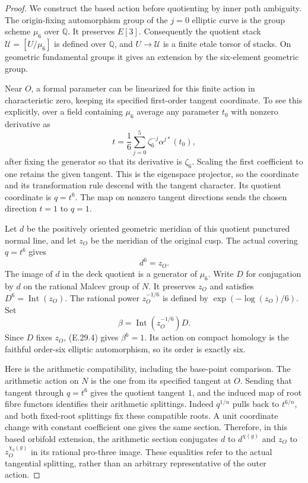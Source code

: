 \begin{proof}
We construct the based action before quotienting by
inner path ambiguity. The origin-fixing automorphism
group of the $j=0$ elliptic curve is the group scheme
$\mu_6$ over $\mathbb Q$. It preserves $E[3]$.
Consequently the quotient stack
$\mathcal U=[U/\mu_6]$ is defined over $\mathbb Q$,
and $U\to\mathcal U$ is a finite etale torsor of
stacks. On geometric fundamental groups it gives
an extension by the six-element geometric group.

Near $O$, a formal parameter can be linearized for
this finite action in characteristic zero, keeping
its specified first-order tangent coordinate. To
see this explicitly, over a field containing
$\mu_6$ average any parameter $t_0$ with nonzero
derivative as
\[
       t=\frac16\sum_{j=0}^5
                 \zeta_6^{-j}\alpha^{j*}(t_0),
\]
after fixing the generator so that its derivative
is $\zeta_6$. Scaling the first coefficient to one
retains the given tangent. This is the eigenspace
projector, so the coordinate and its transformation
rule descend with the tangent character. Its
quotient coordinate is $q=t^6$. The map on nonzero
tangent directions sends the chosen direction
$t=1$ to $q=1$.

Let $d$ be the positively oriented geometric
meridian of this quotient punctured normal line,
and let $z_O$ be the meridian of the original cusp.
The actual covering $q=t^6$ gives
\[
                          d^6=z_O.
 \tag{E.29.4}
\]
The image of $d$ in the deck quotient is a generator
of $\mu_6$. Write $D$ for conjugation by $d$ on the
rational Malcev group of $N$. It preserves $z_O$
and satisfies $D^6=\operatorname{Int}(z_O)$.
The rational power $z_O^{-1/6}$ is defined by
$\exp(-\log(z_O)/6)$. Set
\[
                 \beta=\operatorname{Int}(z_O^{-1/6})D.
 \tag{E.29.5}
\]
Since $D$ fixes $z_O$, (E.29.4) gives $\beta^6=1$.
Its action on compact homology is the faithful
order-six elliptic automorphism, so its order is
exactly six.

Here is the arithmetic compatibility, including
the base-point comparison. The arithmetic action
on $N$ is the one from its specified tangent at
$O$. Sending that tangent through $q=t^6$ gives
the quotient tangent $1$, and the induced map of
root fibre functors identifies their arithmetic
splittings. Indeed $q^{1/n}$ pulls back to
$t^{6/n}$, and both fixed-root splittings fix these
compatible roots. A unit coordinate change with
constant coefficient one gives the same section.
Therefore, in this based orbifold extension, the
arithmetic section conjugates $d$ to $d^{\chi(g)}$
and $z_O$ to $z_O^{\chi_3(g)}$ in its rational
pro-three image. These equalities refer to the
actual tangential splitting, rather than an
arbitrary representative of the outer action.


\end{proof}
